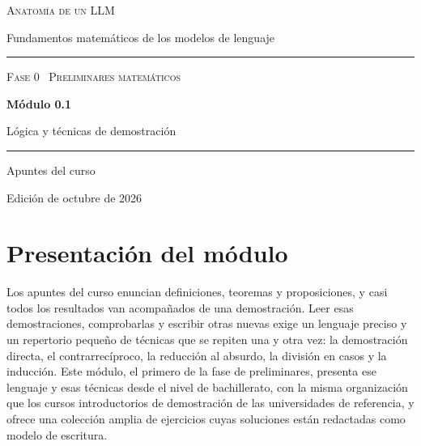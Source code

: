 \documentclass[11pt,a4paper,twoside,openany]{book}
\begin{document}
\frontmatter
\begin{titlepage}
\centering
\vspace*{2.5cm}
{\large\scshape Anatomía de un LLM}\par
\vspace{0.4cm}
{\normalsize Fundamentos matemáticos de los modelos de lenguaje}\par
\vspace{2.2cm}
\rule{\textwidth}{0.8pt}\par\vspace{0.5cm}
{\small\scshape Fase 0 \textperiodcentered\ Preliminares matemáticos}\par\vspace{0.3cm}
{\Huge\bfseries Módulo 0.1\par}\vspace{0.3cm}
{\LARGE Lógica y técnicas de demostración\par}
\vspace{0.5cm}\rule{\textwidth}{0.4pt}\par
\vspace{1.6cm}
{\large Apuntes del curso}\par
\vfill
{\small Edición de octubre de 2026}\par
\end{titlepage}

\chapter*{Presentación del módulo}

Los apuntes del curso enuncian definiciones, teoremas y proposiciones, y casi todos los resultados van acompañados de una demostración. Leer esas demostraciones, comprobarlas y escribir otras nuevas exige un lenguaje preciso y un repertorio pequeño de técnicas que se repiten una y otra vez: la demostración directa, el contrarrecíproco, la reducción al absurdo, la división en casos y la inducción. Este módulo, el primero de la fase de preliminares, presenta ese lenguaje y esas técnicas desde el nivel de bachillerato, con la misma organización que los cursos introductorios de demostración de las universidades de referencia, y ofrece una colección amplia de ejercicios cuyas soluciones están redactadas como modelo de escritura.
\end{document}
